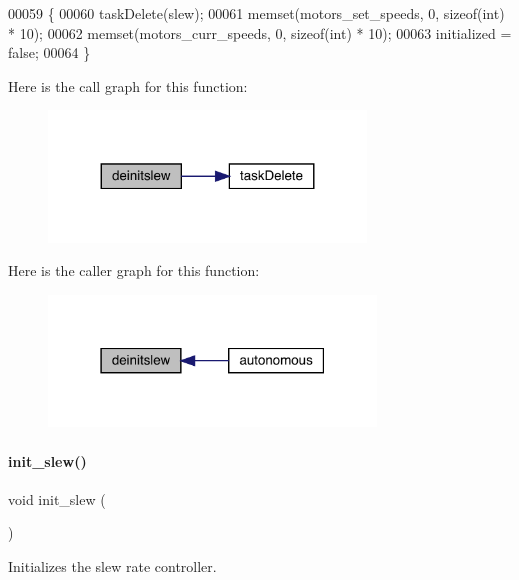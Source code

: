 \begin{DoxyCode}
00059                   \{
00060   taskDelete(slew);
00061   memset(motors_set_speeds, 0, \textcolor{keyword}{sizeof}(\textcolor{keywordtype}{int}) * 10);
00062   memset(motors_curr_speeds, 0, \textcolor{keyword}{sizeof}(\textcolor{keywordtype}{int}) * 10);
00063   initialized = \textcolor{keyword}{false};
00064 \}
\end{DoxyCode}
Here is the call graph for this function\+:
\nopagebreak
\begin{figure}[H]
\begin{center}
\leavevmode
\includegraphics[width=239pt]{slew_8c_a981c9990a969d2587e66e550737f7cd9_cgraph}
\end{center}
\end{figure}
Here is the caller graph for this function\+:
\nopagebreak
\begin{figure}[H]
\begin{center}
\leavevmode
\includegraphics[width=247pt]{slew_8c_a981c9990a969d2587e66e550737f7cd9_icgraph}
\end{center}
\end{figure}
\mbox{\label{slew_8c_a321758941d88b75783955c819bb75005}} 
\paragraph{init\+\_\+slew()}
{\footnotesize\ttfamily void init\+\_\+slew (\begin{DoxyParamCaption}{ }\end{DoxyParamCaption})}



Initializes the slew rate controller. 

